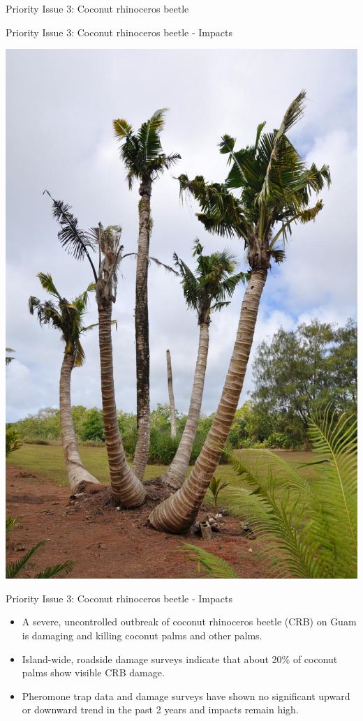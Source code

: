 \documentclass[]{beamer}
\begin{document}
\begin{frame}{Priority Issue 3: Coconut rhinoceros beetle}
\end{frame}

\begin{frame}{Priority Issue 3: Coconut rhinoceros beetle - Impacts}
	\begin{center}
		\includegraphics[height=\textheight]{images/dying_coconuts}
	\end{center}
\end{frame}

\begin{frame}{Priority Issue 3: Coconut rhinoceros beetle - Impacts}
	\begin{itemize}
		\item A severe, uncontrolled outbreak of coconut rhinoceros beetle (CRB) on Guam is damaging and killing coconut palms and other palms. \item Island-wide, roadside damage surveys indicate that about 20\% of coconut palms show visible CRB damage.
		\item  Pheromone trap data and damage surveys have shown no significant upward or downward trend in the past 2 years and impacts remain high.
	\end{itemize}
\end{frame}
\end{document}
